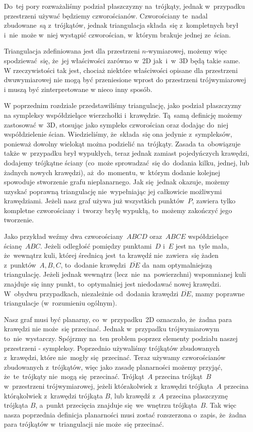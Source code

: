 \documentclass[skorowidz,autorrok,backref,xodstep,oswiadczenie]{wmimgr}
\begin{document}
Do~tej pory rozważaliśmy podział płaszczyzny na~trójkąty, jednak w~przypadku przestrzeni używać będziemy czworościanów. Czworościany te~nadal zbudowane~są z~trójkątów, jednak triangulacja składa~się z~kompletnych brył i~nie~może w~niej wystąpić czworościan, w~którym brakuje jednej ze~ścian.

Triangulacja zdefiniowana jest dla przestrzeni $n$-wymiarowej, możemy więc spodziewać~się, że~jej właściwości zarówno w~2D jak~i~w~3D będą takie same. W rzeczywistości tak jest, chociaż niektóre właściwości opisane dla przestrzeni dwuwymiarowej nie mogą być przeniesione wprost do przestrzeni trójwymiarowej i muszą być zinterpretowane w nieco inny sposób.

W poprzednim rozdziale przedstawiliśmy triangulację, jako podział płaszczyzny na sympleksy współdzielące wierzchołki i~krawędzie. Tą~samą definicję możemy zastosować w~3D, stosując jako sympleks czworościan oraz dodając do~niej współdzielenie ścian. Wiedzieliśmy, że~składa~się ona jedynie z~sympleksów, ponieważ dowolny wielokąt można podzielić na~trójkąty. Zasada ta~obowiązuje także w~przypadku brył wypukłych, teraz jednak zamiast pojedyńczych krawędzi, dodajemy trójkątne ściany (co~może sprowadzać~się do~dodania kilku, jednej, lub żadnych nowych krawędzi), aż~do~momentu, w~którym dodanie kolejnej spowoduje stworzenie grafu nieplanarnego. Jak się~jednak okazuje, możemy uzyskać poprawną triangulację nie~wypełniając jej całkowicie możliwymi krawędziami. Jeżeli nasz graf używa już wszystkich punktów~$P$, zawiera tylko kompletne czworościany i~tworzy bryłę wypukłą, to~możemy zakończyć jego tworzenie.

Jako przykład weźmy dwa czworościany~$A B C D$ oraz~$A B C E$ współdzielące ścianę~$A B C$. Jeżeli odległość pomiędzy punktami~$D$ i~$E$ jest na~tyle mała, że~wewnątrz kuli, której średnicą jest~ta krawędź nie~zawiera~się żaden z~punktów~$A, B, C$, to~dodanie krawędzi~$\overline{D E}$ da~nam optymalniejszą triangulację. Jeżeli jednak wewnątrz (lecz~nie~na~powierzchni) wspomnianej kuli znajduje się inny punkt, to~optymalniej jest niedodawać nowej krawędzi. W~obydwu przypadkach, niezależnie od~dodania krawędzi $\overline{D E}$, mamy poprawne triangulacje (w~rozumieniu ogólnym).

Nasz graf musi być planarny, co~w~przypadku~2D oznaczało, że~żadna para krawędzi nie może~się przecinać. Jednak w~przypadku trójwymiarowym to~nie~wystarczy. Spójrzmy na~ten problem poprzez elementy podziału naszej przestrzeni - sympleksy. Poprzednio używaliśmy trójkątów zbudowanych z~krawędzi, które nie~mogły się~przecinać. Teraz używamy czworościanów zbudowanych z~trójkątów, więc jako zasadę planarności możemy przyjąć, że~te~trójkąty nie~mogą się~przecinać. Trójkąt~$A$ przecina trójkąt~$B$ w~przestrzeni trójwymiarowej, jeżeli którakolwiek z~krawędzi trójkąta~$A$ przecina którąkolwiek z~krawędzi trójkąta $B$, lub krawędź z~$A$ przecina płaszczyznę trójkąta $B$, a~punkt przecięcia znajduje się~we~wnętrzu trójkąta~$B$. Tak więc nasza poprzednia definicja planarności musi zostać rozszerzona o~zapis, że~żadna para trójkątów w~triangulacji nie może~się przecinać.
\end{document}
